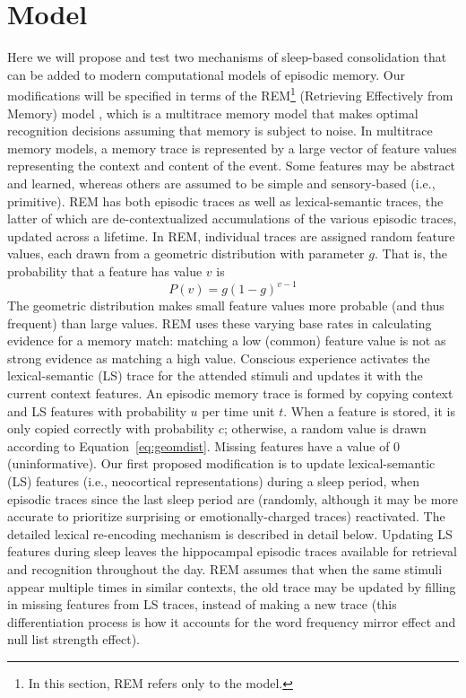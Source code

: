 \documentclass[10pt,letterpaper]{article}
\begin{document}
\section{Model}
\vspace{-.1cm}
Here we will propose and test two mechanisms of sleep-based consolidation that can be added to modern computational models of episodic memory. Our modifications will be specified in terms of the REM\footnote{In this section, REM refers only to the model.} (Retrieving Effectively from Memory) model , which is a multitrace memory model that makes optimal recognition decisions assuming that memory is subject to noise. In multitrace memory models, a memory trace is represented by a large vector of feature values representing the context and content of the event. Some features may be abstract and learned, whereas others are assumed to be simple and sensory-based (i.e., primitive). REM has both episodic traces as well as lexical-semantic traces, the latter of which are de-contextualized accumulations of the various episodic traces, updated across a lifetime. In REM, individual traces are assigned random feature values, each drawn from a geometric distribution with parameter $g$. That is, the probability that a feature has value $v$ is
\begin{equation} \label{eq:geomdist}
P(v) = g(1-g)^{v-1}
\end{equation}
The geometric distribution makes small feature values more probable (and thus frequent) than large values. REM uses these varying base rates in calculating evidence for a memory match: matching a low (common) feature value is not as strong evidence as matching a high value. Conscious experience activates the lexical-semantic (LS) trace for the attended stimuli and updates it with the current context features. An episodic memory trace is formed by copying context and LS features with probability $u$ per time unit $t$. When a feature is stored, it is only copied correctly with probability $c$; otherwise, a random value is drawn according to Equation~\ref{eq:geomdist}. Missing features have a value of 0 (uninformative). Our first proposed modification is to update lexical-semantic (LS) features (i.e., neocortical representations) during a sleep period, when episodic traces since the last sleep period are (randomly, although it may be more accurate to prioritize surprising or emotionally-charged traces) reactivated. The detailed lexical re-encoding mechanism is described in detail below. Updating LS features during sleep leaves the hippocampal episodic traces available for retrieval and recognition throughout the day. REM assumes that when the same stimuli appear multiple times in similar contexts, the old trace may be updated by filling in missing features from LS traces, instead of making a new trace (this differentiation process is how it accounts for the word frequency mirror effect and null list strength effect).
\end{document}
